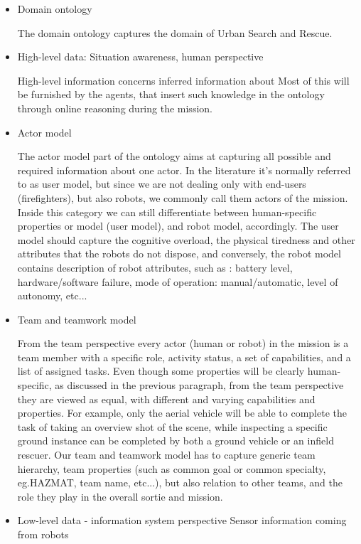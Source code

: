 \begin{itemize}
\begin{itemize}
\item Domain ontology

The domain ontology captures the domain of Urban Search and Rescue.


\item High-level data: Situation awareness, human perspective

High-level information concerns inferred information about 
Most of this will be furnished by the agents, that insert such knowledge in the ontology through online reasoning during the mission. 

\item Actor model

The actor model part of the ontology aims at capturing all possible and required information about one actor. In the literature it's normally referred to as user model, but since we are not dealing only with end-users (firefighters), but also robots, we commonly call them actors of the mission. Inside this category we can still differentiate between human-specific properties or model (user model), and robot model, accordingly. The user model should capture the cognitive overload, the physical tiredness and other attributes that the robots do not dispose, and conversely, the robot model contains description of robot attributes, such as : battery level, hardware/software failure, mode of operation: manual/automatic, level of autonomy, etc... 

\item Team and teamwork model

From the team perspective every actor (human or robot) in the mission is a team member with a specific role, activity status, a set of capabilities, and a list of assigned tasks. Even though some properties will be clearly human-specific, as discussed in the previous paragraph, from the team perspective they are viewed as equal, with different and varying capabilities and properties. For example, only the aerial vehicle will be able to complete the task of taking an overview shot of the scene, while inspecting a specific ground instance can be completed by both a ground vehicle or an infield rescuer. Our team and teamwork model has to capture generic team hierarchy, team properties (such as common goal or common specialty, eg.HAZMAT, team name, etc...), but also relation to other teams, and the role they play in the overall sortie and mission.

\item Low-level data - information system perspective
Sensor information coming from robots


\end{itemize}
\end{itemize}
